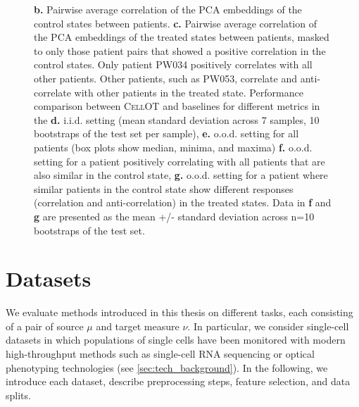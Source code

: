 \begin{figure}[p]
{     \textbf{b.} Pairwise average correlation of the PCA embeddings of the control states between patients. \textbf{c.} Pairwise average correlation of the PCA embeddings of the treated states between patients, masked to only those patient pairs that showed a positive correlation in the control states. Only patient PW034 positively correlates with all other patients. Other patients, such as PW053, correlate and anti-correlate with other patients in the treated state.
     Performance comparison between \textsc{CellOT} and baselines for different metrics in the \textbf{d.} i.i.d. setting (mean standard deviation across 7 samples, 10 bootstraps of the test set per sample),
     \textbf{e.} o.o.d. setting for all patients (box plots show median, minima, and maxima)
     \textbf{f.} o.o.d. setting for a patient positively correlating with all patients that are also similar in the control state,
     \textbf{g.} o.o.d. setting for a patient where similar patients in the control state show different responses (correlation and anti-correlation) in the treated states. Data in \textbf{f} and \textbf{g} are presented as the mean +/- standard deviation across n=10 bootstraps of the test set.
     }
     \label{fig:gbm_patients_iid_ood}
\end{figure}

\clearpage


\section{Datasets} \label{app:datasets}

We evaluate methods introduced in this thesis on different tasks, each consisting of a pair of source $\mu$ and target measure $\nu$.
In particular, we consider single-cell datasets in which populations of single cells have been monitored with modern high-throughput methods such as single-cell RNA sequencing or optical phenotyping technologies (see \cref{sec:tech_background}).
In the following, we introduce each dataset, describe preprocessing steps, feature selection, and data splits.

\subsection{\citet{srivatsan2020massively}}
\label{app:dataset_srivatsan}

